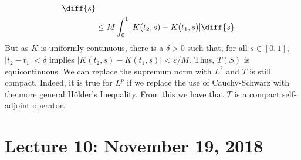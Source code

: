 \begin{example}
\begin{align*}
                    \diff{s}\\
                    &\leq{M}\int_{0}^{1}|K(t_{2},s)-K(t_{1},s)|
                    \diff{s}
                \end{align*}
                But as $K$ is uniformly continuous,
                there is a $\delta>0$
                such that, for all $s\in[0,1]$,
                $|t_{2}-t_{1}|<\delta$ implies
                $|K(t_{2},s)-K(t_{1},s)|<\varepsilon/M$.
                Thus, $T(S)$ is equicontinuous. We can replace the
                supremum norm with $L^{2}$ and $T$ is still compact.
                Indeed, it is true for $L^{p}$ if we replace the
                use of Cauchy-Schwarz with the more general
                H\"{o}lder's Inequality. From this we have that
                $T$ is a compact self-adjoint operator.
            \end{example}
    \section{Lecture 10: November 19, 2018}
